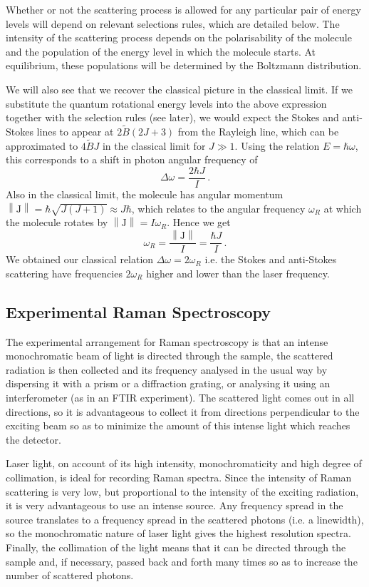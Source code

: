 \documentclass{article}
\theoremstyle{plain}\theoremheaderfont{\normalfont\itshape}\theorembodyfont{\rmfamily}\theoremseparator{.}\newtheorem*{rem}{Remark}\newtheorem*{ex}{Example}\newtheorem*{proof}{Proof}\newtheorem*{altp}{Alternative proof}
\theoremstyle{plain}\theoremheaderfont{\normalfont\bfseries}\theorembodyfont{\rmfamily}\theoremseparator{.}\newtheorem{thm}{Theorem}[section]\newtheorem{lem}[thm]{Lemma}\newtheorem{prop}[thm]{Proposition}\newtheorem*{cor}{Corollary}\newtheorem{defn}[thm]{Definition}\newtheorem{clm}[thm]{Claim}\newtheorem{clminproof}{Claim}\newtheorem{pos}{Postulate}[section]
\theoremstyle{break}\theoremheaderfont{\normalfont\itshape}\theorembodyfont{\rmfamily}\theoremseparator{.\medskip}\newtheorem*{proofskip}{Proof}\newtheorem*{exs}{Examples}\newtheorem*{rems}{Remarks}
\theoremstyle{break}\theoremheaderfont{\normalfont\bfseries}\theorembodyfont{\rmfamily}\theoremseparator{.\medskip}\newtheorem{lemskip}[thm]{Lemma}\newtheorem{defnskip}[thm]{Definition}\newtheorem{propskip}[thm]{Proposition}\newtheorem{thmskip}[thm]{Theorem}
\numberwithin{equation}{section}
\newcommand{\vb}[1]{\bm{\mathrm{#1}}}
\newcommand{\norm}[1]{\left\| #1 \right\|}
\begin{document}
    Whether or not the scattering process is allowed for any particular pair of energy levels will depend on relevant selections rules, which are detailed below. The intensity of the scattering process depends on the polarisability of the molecule and the population of the energy level in which the molecule starts. At equilibrium, these populations will be determined by the Boltzmann distribution.

    We will also see that we recover the classical picture in the classical limit. If we substitute the quantum rotational energy levels into the above expression together with the selection rules (see later), we would expect the Stokes and anti-Stokes lines to appear at \(2\tilde{B}(2J+3)\) from the Rayleigh line, which can be approximated to \(4\tilde{B}J\) in the classical limit for \(J\gg 1\). Using the relation \(E=\hbar\omega\), this corresponds to a shift in photon angular frequency of
    \begin{equation}
        \Delta\omega=\frac{2\hbar J}{I}\,.
    \end{equation}
    Also in the classical limit, the molecule has angular momentum \(\norm{\vb{J}}=\hbar\sqrt{J(J+1)}\approx J\hbar\), which relates to the angular frequency \(\omega_R\) at which the molecule rotates by \(\norm{\vb{J}}=I\omega_R\). Hence we get
    \begin{equation}
        \omega_R=\frac{\norm{\vb{J}}}{I}=\frac{\hbar J}{I}\,.
    \end{equation}
    We obtained our classical relation \(\Delta\omega=2\omega_R\) i.e. the Stokes and anti-Stokes scattering have frequencies \(2\omega_R\) higher and lower than the laser frequency.

    \subsection{Experimental Raman Spectroscopy}
    The experimental arrangement for Raman spectroscopy is that an intense monochromatic beam of light is directed through the sample, the scattered radiation is then collected and its frequency analysed in the usual way by dispersing it with a prism or a diffraction grating, or analysing it using an interferometer (as in an FTIR experiment). The scattered light comes out in all directions, so it is advantageous to collect it from directions perpendicular to the exciting beam so as to minimize the amount of this intense light which reaches the detector.
    
    Laser light, on account of its high intensity, monochromaticity and high degree of collimation, is ideal for recording Raman spectra. Since the intensity of Raman scattering is very low, but proportional to the intensity of the exciting radiation, it is very advantageous to use an intense source. Any frequency spread in the source translates to a frequency spread in the scattered photons (i.e. a linewidth), so the monochromatic nature of laser light gives the highest resolution spectra. Finally, the collimation of the light means that it can be directed through the sample and, if necessary, passed back and forth many times so as to increase the number of scattered photons.
    
\end{document}
